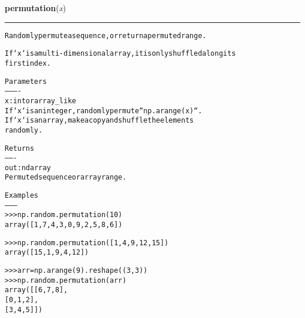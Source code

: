\hspace{.8\funcindent}\begin{boxedminipage}{\funcwidth}

    \raggedright \textbf{permutation}(\textit{x})

    \vspace{-1.5ex}

    \rule{\textwidth}{0.5\fboxrule}
\setlength{\parskip}{2ex}
\begin{alltt}
Randomly permute a sequence, or return a permuted range.

If `x` is a multi-dimensional array, it is only shuffled along its
first index.

Parameters
----------
x : int or array\_like
    If `x` is an integer, randomly permute ``np.arange(x)``.
    If `x` is an array, make a copy and shuffle the elements
    randomly.

Returns
-------
out : ndarray
    Permuted sequence or array range.

Examples
--------
{\textgreater}{\textgreater}{\textgreater} np.random.permutation(10)
array([1, 7, 4, 3, 0, 9, 2, 5, 8, 6])

{\textgreater}{\textgreater}{\textgreater} np.random.permutation([1, 4, 9, 12, 15])
array([15,  1,  9,  4, 12])

{\textgreater}{\textgreater}{\textgreater} arr = np.arange(9).reshape((3, 3))
{\textgreater}{\textgreater}{\textgreater} np.random.permutation(arr)
array([[6, 7, 8],
       [0, 1, 2],
       [3, 4, 5]])
\end{alltt}

\setlength{\parskip}{1ex}
    \end{boxedminipage}

    \label{QSTK:qstklearn:mldiagnostics:poisson}

    \vspace{0.5ex}

